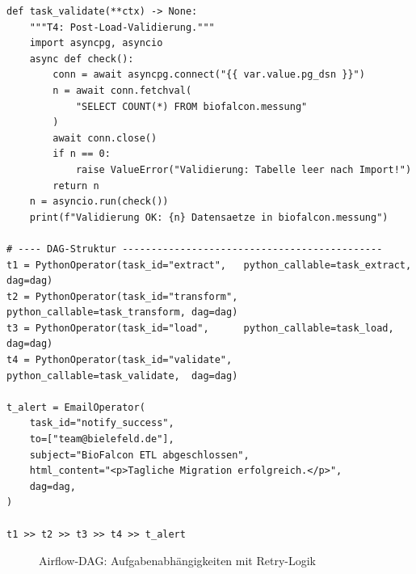﻿\documentclass[12pt,a4paper]{report}
\theoremstyle{definition}
\theoremstyle{remark}
\begin{document}
\begin{lstlisting}[style=python, caption={airflow\_dag.py: ETL-Pipeline als Airflow-DAG}, label=lst:airflow]
def task_validate(**ctx) -> None:
    """T4: Post-Load-Validierung."""
    import asyncpg, asyncio
    async def check():
        conn = await asyncpg.connect("{{ var.value.pg_dsn }}")
        n = await conn.fetchval(
            "SELECT COUNT(*) FROM biofalcon.messung"
        )
        await conn.close()
        if n == 0:
            raise ValueError("Validierung: Tabelle leer nach Import!")
        return n
    n = asyncio.run(check())
    print(f"Validierung OK: {n} Datensaetze in biofalcon.messung")

# ---- DAG-Struktur ---------------------------------------------
t1 = PythonOperator(task_id="extract",   python_callable=task_extract,  dag=dag)
t2 = PythonOperator(task_id="transform", python_callable=task_transform, dag=dag)
t3 = PythonOperator(task_id="load",      python_callable=task_load,      dag=dag)
t4 = PythonOperator(task_id="validate",  python_callable=task_validate,  dag=dag)

t_alert = EmailOperator(
    task_id="notify_success",
    to=["team@bielefeld.de"],
    subject="BioFalcon ETL abgeschlossen",
    html_content="<p>Tagliche Migration erfolgreich.</p>",
    dag=dag,
)

t1 >> t2 >> t3 >> t4 >> t_alert
\end{lstlisting}

\begin{figure}[H]
\centering
{}
\caption{Airflow-DAG: Aufgabenabhängigkeiten mit Retry-Logik}
\label{fig:dag}
\end{figure}
\end{document}
